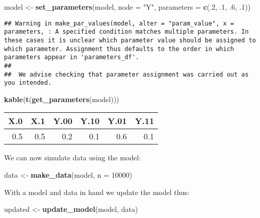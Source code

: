 \documentclass[
  12pt,
]{book}
\newenvironment{Shaded}{\begin{snugshade}}{\end{snugshade}}
\newcommand{\AttributeTok}[1]{\textcolor[rgb]{0.13,0.29,0.53}{#1}}
\newcommand{\DecValTok}[1]{\textcolor[rgb]{0.00,0.00,0.81}{#1}}
\newcommand{\FunctionTok}[1]{\textcolor[rgb]{0.13,0.29,0.53}{\textbf{#1}}}
\newcommand{\NormalTok}[1]{#1}
\newcommand{\OtherTok}[1]{\textcolor[rgb]{0.56,0.35,0.01}{#1}}
\newcommand{\StringTok}[1]{\textcolor[rgb]{0.31,0.60,0.02}{#1}}
\begin{document}
\begin{Shaded}
\begin{Highlighting}[]
\NormalTok{model }\OtherTok{\textless{}{-}} 
  \FunctionTok{set\_parameters}\NormalTok{(model, }\AttributeTok{node =} \StringTok{"Y"}\NormalTok{, }\AttributeTok{parameters =} \FunctionTok{c}\NormalTok{(.}\DecValTok{2}\NormalTok{, .}\DecValTok{1}\NormalTok{, .}\DecValTok{6}\NormalTok{, .}\DecValTok{1}\NormalTok{))}
\end{Highlighting}
\end{Shaded}

\begin{verbatim}
## Warning in make_par_values(model, alter = "param_value", x = parameters, : A specified condition matches multiple parameters. In these cases it is unclear which parameter value should be assigned to which parameter. Assignment thus defaults to the order in which parameters appear in 'parameters_df'.
##               
##  We advise checking that parameter assignment was carried out as you intended.
\end{verbatim}

\begin{Shaded}
\begin{Highlighting}[]
\FunctionTok{kable}\NormalTok{(}\FunctionTok{t}\NormalTok{(}\FunctionTok{get\_parameters}\NormalTok{(model)))}
\end{Highlighting}
\end{Shaded}

\begin{tabular}{r|r|r|r|r|r}
\hline
X.0 & X.1 & Y.00 & Y.10 & Y.01 & Y.11\\
\hline
0.5 & 0.5 & 0.2 & 0.1 & 0.6 & 0.1\\
\hline
\end{tabular}

We can now simulate data using the model:

\begin{Shaded}
\begin{Highlighting}[]
\NormalTok{data }\OtherTok{\textless{}{-}} \FunctionTok{make\_data}\NormalTok{(model, }\AttributeTok{n =} \DecValTok{10000}\NormalTok{)}
\end{Highlighting}
\end{Shaded}

With a model and data in hand we update the model thus:

\begin{Shaded}
\begin{Highlighting}[]
\NormalTok{updated }\OtherTok{\textless{}{-}} \FunctionTok{update\_model}\NormalTok{(model, data)}
\end{Highlighting}
\end{Shaded}
\end{document}
